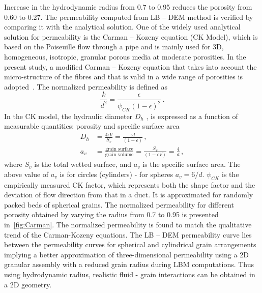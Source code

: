 Increase in the hydrodynamic radius from 0.7 to 0.95 reduces the porosity from 
0.60 to 0.27. The permeability computed from LB – DEM method is verified by 
comparing it with the analytical solution. One of the widely used analytical 
solution for permeability is the Carman – Kozeny equation (CK Model), 
which is based on the Poiseuille flow through a pipe and is mainly used for 3D, 
homogeneous, isotropic, granular porous media at moderate porosities. In the 
present study, a modified Carman – Kozeny equation that takes into account the 
micro-structure of the fibres and that is valid in a wide range of porosities 
is adopted~\citep{Yazdchi2011}. The normalized permeability is defined as
\begin{equation}
\frac{k}{d^2} = \frac{\epsilon}{\psi_{CK}(1-\epsilon)^2} \,.
\end{equation}
%
In the CK model, the hydraulic diameter $D_h$ , is expressed as a function of 
measurable quantities: porosity and specific surface area
%
\begin{align}
D_h & = \frac{4\epsilon V}{S_v}=\frac{\epsilon d}{(1 - \epsilon)} \,, \\
a_v & = \frac{\mbox{grain surface}}{\mbox{grain volume}} = 
\frac{S_v}{(1-\epsilon V)} = \frac{4}{d} \,,
\end{align}
%
where $S_v$ is the total wetted surface, and $a_v$ is the specific surface 
area. The above value of $a_v$ is for circles (cylinders) - for spheres $a_v = 
6/d$. $\psi_{CK}$ is the empirically  measured CK factor, which represents both 
the shape factor and the deviation of flow direction from that in a duct. It is 
approximated for randomly packed beds of spherical grains. The normalized 
permeability for different porosity obtained by varying the radius from 0.7 to 
0.95 is presented in~\cref{fig:Carman}. The normalized permeability is found to 
match the qualitative trend of the Carman-Kozeny equations. The LB – DEM 
permeability curve lies between the permeability curves for spherical and 
cylindrical grain arrangements implying a better approximation of 
three-dimensional permeability using a 2D granular assembly with a reduced 
grain radius during LBM computations. Thus using hydrodynamic radius, realistic 
fluid - grain interactions can be obtained in a 2D geometry.

